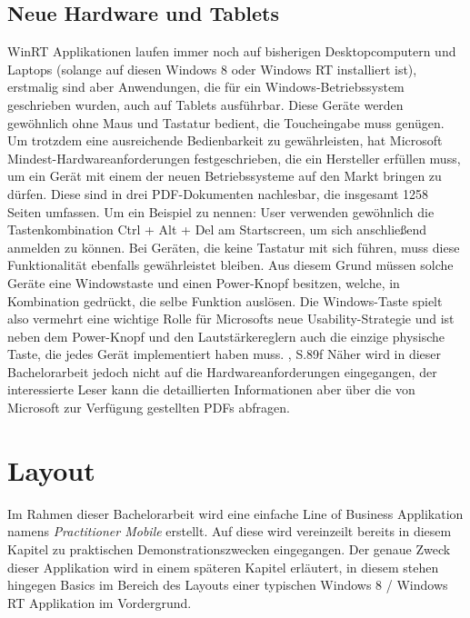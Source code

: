 \documentclass[a4paper,bibtotoc,oneside]{scrbook}
\begin{document}
\section[Neue Hardware und Tablets]{Neue Hardware und Tablets}
WinRT Applikationen laufen immer noch auf bisherigen Desktopcomputern und Laptops (solange auf diesen Windows 8 oder Windows RT installiert ist), erstmalig sind aber Anwendungen, die für ein Windows-Betriebssystem geschrieben wurden, auch auf Tablets ausführbar.
\newline
Diese Geräte werden gewöhnlich ohne Maus und Tastatur bedient, die Toucheingabe muss genügen. Um trotzdem eine ausreichende Bedienbarkeit zu gewährleisten, hat Microsoft Mindest-Hardwareanforderungen festgeschrieben, die ein Hersteller erfüllen muss, um ein Gerät mit einem der neuen Betriebssysteme auf den Markt bringen zu dürfen.
\newline
Diese sind in drei PDF-Dokumenten nachlesbar, die insgesamt 1258 Seiten umfassen. Um ein Beispiel zu nennen: User verwenden gewöhnlich die Tastenkombination Ctrl + Alt + Del am Startscreen, um sich anschließend anmelden zu können. Bei Geräten, die keine Tastatur mit sich führen, muss diese Funktionalität ebenfalls gewährleistet bleiben. Aus diesem Grund müssen solche Geräte eine Windowstaste und einen Power-Knopf besitzen, welche, in Kombination gedrückt, die selbe Funktion auslösen.
\newline
\newline
Die Windows-Taste spielt also vermehrt eine wichtige Rolle für Microsofts neue Usability-Strategie und ist neben dem Power-Knopf und den Lautstärkereglern auch die einzige physische Taste, die jedes Gerät implementiert haben muss. \cite{hw12}, S.89f
\newline
\newline
Näher wird in dieser Bachelorarbeit jedoch nicht auf die Hardwareanforderungen eingegangen, der interessierte Leser kann die detaillierten Informationen aber über die von Microsoft zur Verfügung gestellten PDFs abfragen.


\chapter[Layout]{Layout}
Im Rahmen dieser Bachelorarbeit wird eine einfache Line of Business Applikation namens \textit{Practitioner Mobile} erstellt. Auf diese wird vereinzeilt bereits in diesem Kapitel zu praktischen Demonstrationszwecken eingegangen. Der genaue Zweck dieser Applikation wird in einem späteren Kapitel erläutert, in diesem stehen hingegen Basics im Bereich des Layouts einer typischen Windows 8 / Windows RT Applikation im Vordergrund.
\end{document}
